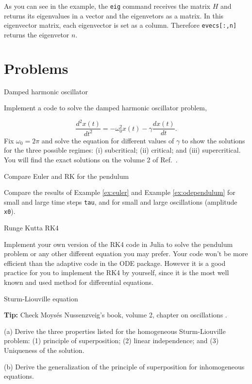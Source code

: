 As you can see in the example, the \texttt{eig} command receives the matrix $H$ and returns its eigenvalues in a vector and the eigenvetors as a matrix. In this eigenvector matrix, each eigenvector is set as a column. Therefore \texttt{evecs[:,n]} returns the eigenvetor $n$.

\section{Problems}

\begin{problem}{Damped harmonic oscillator}
 \label{prob:damped}

 Implement a code to solve the damped harmonic oscillator problem,
 
 \begin{equation}
  \dfrac{d^2 x(t)}{dt^2} = -\omega_0^2 x(t) - \gamma \dfrac{dx(t)}{dt}.
 \end{equation}
 Fix $\omega_0 = 2\pi$ and solve the equation for different values of $\gamma$ to show the solutions for the three possible regimes: (i) subcritical; (ii) critical; and (iii) supercritical. You will find the exact solutions on the volume 2 of Ref.~\cite{nussenzveig2007curso}.
\end{problem}

\begin{problem}{Compare Euler and RK for the pendulum}
 \label{prob:compareEulerRK}
 
 Compare the results of Example \ref{ex:euler} and Example \ref{ex:odependulum} for small and large time steps \texttt{tau}, and for small and large oscillations (amplitude \texttt{x0}).
\end{problem}

\begin{problem}{Runge Kutta RK4}
 \label{prob:rk4}
 
 Implement your own version of the RK4 code in Julia to solve the pendulum problem or any other different equation you may prefer. Your code won't be more efficient than the adaptive code in the ODE package. However it is a good practice for you to implement the RK4 by yourself, since it is the most well known and used method for differential equations.
\end{problem}

\begin{problem}{Sturm-Liouville equation}
 \label{prob:sturmliouville}

 \textbf{Tip:} Check Moysés Nussenzveig's book, volume 2, chapter on oscillations \cite{nussenzveig2007curso}.
 
 (a) Derive the three properties listed for the homogeneous Sturm-Liouville problem: (1) principle of superposition; (2) linear independence; and (3) Uniqueness of the solution.
 
 (b) Derive the generalization of the principle of superposition for inhomogeneous equations.
  
\end{problem}

